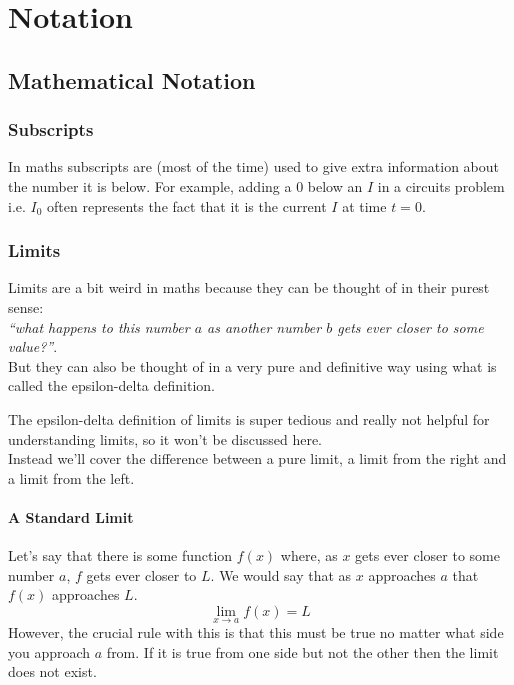 \documentclass[main.tex]{subfiles}
\begin{document}
    \chapter{Notation}
        \label{ch: Notation}
        \thispagestyle{noheader}

        \section{Mathematical Notation}
            \label{sec: Mathematical Notation}

            \subsection{Subscripts}
                \label{subsec: Subscript Notation}

                In maths subscripts are (most of the time) used to give extra information about the number it is below. For example, adding a $0$ below an $I$ in a circuits problem i.e. $I_0$ often represents the fact that it is the current $I$ at time $t=0$.


            \subsection{Limits}
                \label{subsec: Limits}
    
                Limits are a bit weird in maths because they can be thought of in their purest sense: \\ \textit{``what happens to this number $a$ as another number $b$ gets ever closer to some value?''}.\\
                But they can also be thought of in a very pure and definitive way using what is called the epsilon-delta definition.
    
                The epsilon-delta definition of limits is super tedious and really not helpful for understanding limits, so it won't be discussed here.\\Instead we'll cover the difference between a pure limit, a limit from the right and a limit from the left.
    
                \subsubsection{A Standard Limit}
                    \label{subsubsec: A Standard Limit}
    
                    Let's say that there is some function $f(x)$ where, as $x$ gets ever closer to some number $a$, $f$ gets ever closer to $L$. We would say that as $x$ approaches $a$ that $f(x)$ approaches $L$.
                    \begin{equation}
                        \lim_{x\to a} f(x) = L
                    \end{equation}
                    However, the crucial rule with this is that this must be true no matter what side you approach $a$ from. If it is true from one side but not the other then the limit does not exist.
    
\end{document}
